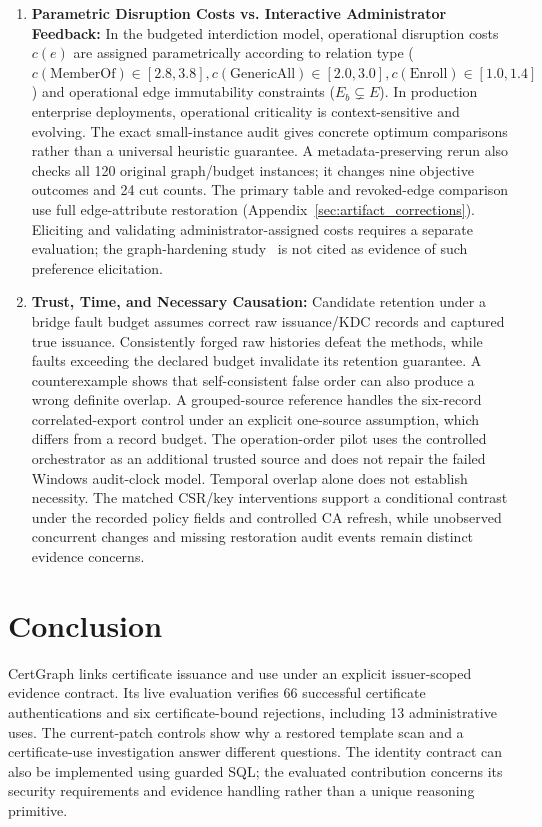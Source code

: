 \begin{enumerate}
    \item \textbf{Parametric Disruption Costs vs. Interactive Administrator Feedback:} In the budgeted interdiction model, operational disruption costs $c(e)$ are assigned parametrically according to relation type ($c(\text{MemberOf}) \in [2.8, 3.8], c(\text{GenericAll}) \in [2.0, 3.0], c(\text{Enroll}) \in [1.0, 1.4]$) and operational edge immutability constraints ($E_b \subsetneq E$). In production enterprise deployments, operational criticality is context-sensitive and evolving. The exact small-instance audit gives concrete optimum comparisons rather than a universal heuristic guarantee. A metadata-preserving rerun also checks all 120 original graph/budget instances; it changes nine objective outcomes and 24 cut counts. The primary table and revoked-edge comparison use full edge-attribute restoration (Appendix~\ref{sec:artifact_corrections}). Eliciting and validating administrator-assigned costs requires a separate evaluation; the graph-hardening study~\cite{goel2024hardening} is not cited as evidence of such preference elicitation.
    \item \textbf{Trust, Time, and Necessary Causation:} Candidate retention under a bridge fault budget assumes correct raw issuance/KDC records and captured true issuance. Consistently forged raw histories defeat the methods, while faults exceeding the declared budget invalidate its retention guarantee. A counterexample shows that self-consistent false order can also produce a wrong definite overlap. A grouped-source reference handles the six-record correlated-export control under an explicit one-source assumption, which differs from a record budget. The operation-order pilot uses the controlled orchestrator as an additional trusted source and does not repair the failed Windows audit-clock model. Temporal overlap alone does not establish necessity. The matched CSR/key interventions support a conditional contrast under the recorded policy fields and controlled CA refresh, while unobserved concurrent changes and missing restoration audit events remain distinct evidence concerns.
\end{enumerate}

\section{Conclusion}
\label{sec:conclusion}
CertGraph links certificate issuance and use under an explicit issuer-scoped evidence contract. Its live evaluation verifies 66 successful certificate authentications and six certificate-bound rejections, including 13 administrative uses. The current-patch controls show why a restored template scan and a certificate-use investigation answer different questions. The identity contract can also be implemented using guarded SQL; the evaluated contribution concerns its security requirements and evidence handling rather than a unique reasoning primitive.

